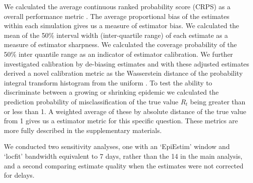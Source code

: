 \documentclass[10pt,letterpaper]{article}
\begin{document}
We calculated the average continuous ranked probability score (CRPS) as a overall performance metric \cite{anderson1996,bosse2024,bosse2023,brocker2008,gneiting2007}. The average proportional bias of the estimates within each simulation gives us a measure of estimator bias. We calculated the mean of the 50\% interval width (inter-quartile range) of each estimate as a measure of estimator sharpness. We calculated the coverage probability of the 50\% inter quantile range as an indicator of estimator calibration. We further investigated calibration by de-biasing estimates and with these adjusted estimates derived a novel calibration metric as the Wasserstein distance \cite{panaretos2019} of the probability integral transform histogram from the uniform \cite{david1948,hamill2001,wilks2019,brockwell2007}. To test the ability to discriminate between a growing or shrinking epidemic we calculated the prediction probability of misclassification of the true value $R_t$ being greater than or less than 1. A weighted average of these by absolute distance of the true value from 1 gives us a estimator metric for this specific question. These metrics are more fully described in the supplementary materials.

We conducted two sensitivity analyses, one with an `EpiEstim' window and `locfit' bandwidth equivalent to 7 days, rather than the 14 in the main analysis, and a second comparing estimate quality when the estimates were not corrected for delays.

\end{document}
